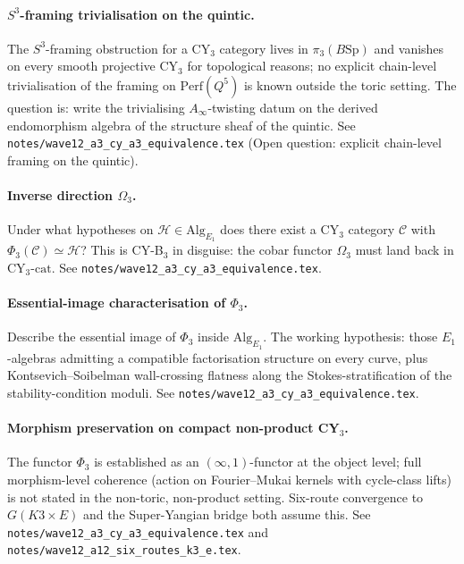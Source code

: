 \documentclass[11pt]{article}
\providecommand{\Eone}{E_1}
\providecommand{\Perf}{\mathrm{Perf}}
\begin{document}
\paragraph{$S^3$-framing trivialisation on the quintic.} The
$S^3$-framing obstruction for a CY$_3$ category lives in
$\pi_3(B\mathrm{Sp})$ and vanishes on every smooth projective CY$_3$
for topological reasons; no explicit chain-level trivialisation of
the framing on $\Perf(Q^5)$ is known outside the toric setting. The
question is: write the trivialising $A_\infty$-twisting datum on the
derived endomorphism algebra of the structure sheaf of the quintic.
See \texttt{notes/wave12\_a3\_cy\_a3\_equivalence.tex}
(Open question: explicit chain-level framing on the quintic).

\paragraph{Inverse direction $\Omega_3$.} Under what hypotheses on
$\mathcal{H} \in \mathrm{Alg}_{\Eone}$ does there exist a CY$_3$
category $\mathcal{C}$ with $\Phi_3(\mathcal{C}) \simeq \mathcal{H}$?
This is CY-B$_3$ in disguise: the cobar functor $\Omega_3$ must land
back in $\mathrm{CY}_3\text{-cat}$. See
\texttt{notes/wave12\_a3\_cy\_a3\_equivalence.tex}.

\paragraph{Essential-image characterisation of $\Phi_3$.} Describe the
essential image of $\Phi_3$ inside $\mathrm{Alg}_{\Eone}$. The
working hypothesis: those $\Eone$-algebras admitting a compatible
factorisation structure on every curve, plus Kontsevich--Soibelman
wall-crossing flatness along the Stokes-stratification of the
stability-condition moduli. See
\texttt{notes/wave12\_a3\_cy\_a3\_equivalence.tex}.

\paragraph{Morphism preservation on compact non-product CY$_3$.} The
functor $\Phi_3$ is established as an $(\infty, 1)$-functor at the
object level; full morphism-level coherence (action on
Fourier--Mukai kernels with cycle-class lifts) is not stated in the
non-toric, non-product setting. Six-route convergence to
$G(K3 \times E)$ and the Super-Yangian bridge both assume this.
See \texttt{notes/wave12\_a3\_cy\_a3\_equivalence.tex} and
\texttt{notes/wave12\_a12\_six\_routes\_k3\_e.tex}.
\end{document}
